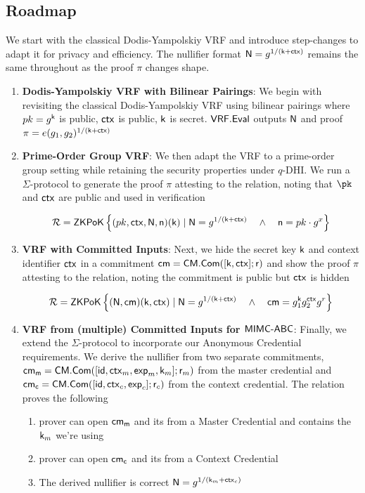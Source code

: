 



\subsection*{Roadmap}
We start with the classical Dodis-Yampolskiy VRF \cite{hutchison_verifiable_2005} and introduce step-changes to adapt it for privacy and efficiency. The nullifier format $\mathsf{N} = g^{1/(\mathsf{k}+\mathsf{ctx})}$ remains the same throughout as the proof $\pi$ changes shape.
\begin{enumerate}
    \item \textbf{Dodis-Yampolskiy VRF with Bilinear Pairings}: We begin with revisiting the classical Dodis-Yampolskiy VRF using bilinear pairings where 
    $pk = g^{\mathsf{k}}$ is public, $\mathsf{ctx}$ is public, $\mathsf{k}$ is secret. $\mathsf{VRF.Eval}$ outputs $\mathsf{N}$ and proof $\pi = e(g_1, g_2)^{1/(\mathsf{k} + \mathsf{ctx})}$
    
    \item \textbf{Prime-Order Group VRF}: We then adapt the VRF to a prime-order group setting while retaining the security properties under $q$-DHI. We run a $\Sigma$-protocol to generate the proof $\pi$ attesting to the relation, noting that $\pk$ and $\mathsf{ctx}$ are public and used in verification

    \[
    \mathcal{R} = {\mathsf{ZKPoK}} \left\{(pk, \mathsf{ctx}, \mathsf{N}, \mathsf{n}) (\mathsf{k}) \mid \mathsf{N} = g^{1/(\mathsf{k} + \mathsf{ctx})} \quad \wedge \quad \mathsf{n} =  pk \cdot g^x  \right\}
    \]
    
    \item \textbf{VRF with Committed Inputs}: Next, we hide the secret key $\mathsf{k}$ and context identifier $\mathsf{ctx}$ in a commitment $\mathsf{cm} = \mathsf{CM.Com}([\mathsf{k}, \mathsf{ctx}]; \mathsf{r})$ and show the proof $\pi$ attesting to the relation, noting the commitment is public but $\mathsf{ctx}$ is hidden

    \[
    \mathcal{R} = {\mathsf{ZKPoK}} \left\{ (\mathsf{N}, \mathsf{cm})(\mathsf{k}, \mathsf{ctx}) \mid \mathsf{N} = g^{1/(\mathsf{k} + \mathsf{ctx})} \quad \wedge \quad \mathsf{cm} = g_1^{\mathsf{k}} g_2^{\mathsf{ctx}}g^r  \right\}
    \]

    \item \textbf{VRF from (multiple) Committed Inputs for $\mathsf{MIMC\text{-}ABC}$}: Finally, we extend the $\Sigma$-protocol to incorporate our Anonymous Credential requirements. We derive the nullifier from two separate commitments, $\mathsf{cm_m} = \mathsf{CM.Com}([\mathsf{id}, \mathsf{ctx}_m, \mathsf{exp}_m, \mathsf{k}_m]; \mathsf{r}_m)$ from the master credential and $\mathsf{cm_c} = \mathsf{CM.Com}([\mathsf{id}, \mathsf{ctx}_c, \mathsf{exp}_c]; \mathsf{r}_c)$ from the context credential. The relation proves the following 
    \begin{enumerate}
        \item prover can open $\mathsf{cm_m}$ and its from a Master Credential and contains the $\mathsf{k}_m$ we're using %
        \item prover can open $\mathsf{cm_c}$ and its from a Context Credential
        \item The derived nullifier is correct $\mathsf{N} = g^{1/(\mathsf{k}_m + \mathsf{ctx}_c)}$ 
    \end{enumerate}
    

\end{enumerate}

